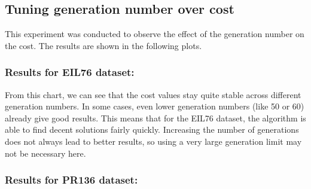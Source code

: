 \documentclass{scrartcl}
\begin{document}
\subsection[Experiment 2]{Tuning generation number over cost}

This experiment was conducted to observe the effect of the generation number on the cost. The results are shown in the following plots.

\subsubsection{Results for EIL76 dataset:}


From this chart, we can see that the cost values stay quite stable across different generation numbers. In some cases, even lower generation numbers (like 50 or 60) already give good results. This means that for the EIL76 dataset, the algorithm is able to find decent solutions fairly quickly. Increasing the number of generations does not always lead to better results, so using a very large generation limit may not be necessary here.


\subsubsection{Results for PR136 dataset:}
\end{document}
